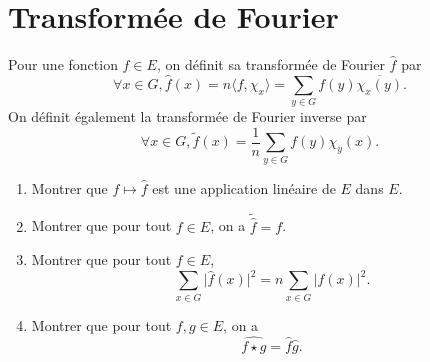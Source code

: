 \documentclass{article}[a4paper]
\newcommand{\braket}[2]{\langle #1,#2\rangle}
\begin{document}
\section{Transformée de Fourier}
Pour une fonction \(f\in E\), on définit sa transformée de Fourier \(\hat{f}\) par 
\begin{equation*}
    \forall x\in G, \hat{f}(x) = n\braket{f}{\chi_x} = \sum_{y\in G} f(y)\overline{\chi_x(y)}.
\end{equation*}
On définit également la transformée de Fourier inverse par
\begin{equation*}
    \forall x\in G, \tilde{f}(x) = \frac{1}{n}\sum_{y\in G} f(y)\chi_y(x).
\end{equation*}
\begin{enumerate}
    \item Montrer que \(f\mapsto \hat{f}\) est une application linéaire de \(E\) dans \(E\).
    \item Montrer que pour tout \(f\in E\), on a \(\tilde{\hat{f}} = f\).
    \item Montrer que pour tout \(f\in E\), 
    \begin{equation*}
        \sum_{x\in G} \lvert \hat{f}(x)\rvert^2 = n\sum_{x\in G} \lvert f(x)\rvert^2.
    \end{equation*}
    \item Montrer que pour tout \(f,g\in E\), on a
    \begin{equation*}
        \widehat{f\star g} = \hat{f}\hat{g}.
    \end{equation*}
\end{enumerate}
\end{document}
